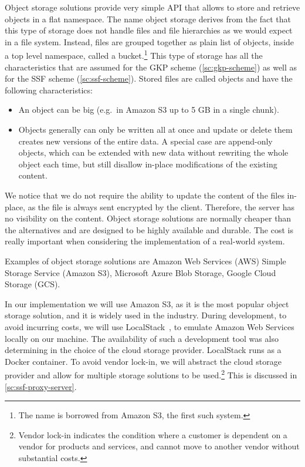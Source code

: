 Object storage solutions provide
very simple API that allows to store and retrieve
objects in a flat namespace.
The name object storage derives from the fact that this type
of storage does not handle files and file hierarchies 
as we would expect in a file system. Instead,
files are grouped together as plain list of objects,
inside a top level namespace, called a bucket.\footnote{The name is borrowed from Amazon S3, the first such system.}
This type of storage has all the characteristics that are assumed
for the GKP scheme (\cref{sc:gkp-scheme}) as well as for the SSF scheme (\cref{sc:ssf-scheme}).
Stored files are called objects and have the following characteristics:
\begin{itemize}
    \item An object can be big (e.g.\ in Amazon S3 up to 5 GB in a single chunk).
    \item Objects generally can only be written all at once and update or delete them creates new versions of the entire data. A special case are append-only objects, which can be extended with new data without rewriting the whole object each time, but still disallow in-place modifications of the existing content.
\end{itemize} 

We notice that we do not require the ability to update the content of the files in-place,
as the file is always sent encrypted by the client. Therefore, the server has no visibility 
on the content.
Object storage solutions are normally cheaper than the alternatives
and are designed to be highly available and durable.
The cost is really important when considering the implementation
of a real-world system.

Examples of object storage solutions are Amazon Web Services (AWS)
Simple Storage Service (Amazon S3), Microsoft Azure Blob Storage, Google Cloud Storage (GCS).

In our implementation we will use Amazon S3, as it is the most
popular object storage solution, and it is widely used in the industry.
During development, to avoid incurring costs, we will use LocalStack~\cite{LocalStack},
to emulate Amazon Web Services locally on our machine. The availability
of such a development tool was also determining in the choice
of the cloud storage provider. LocalStack
runs as a Docker container.
To avoid vendor lock-in, we will abstract the cloud storage provider
and allow for multiple storage solutions to be used.\footnote{Vendor lock-in indicates the condition where a customer is dependent on a vendor for products and services, and cannot move to another vendor without substantial costs.}
This is discussed in \cref{sc:ssf-proxy-server}.


